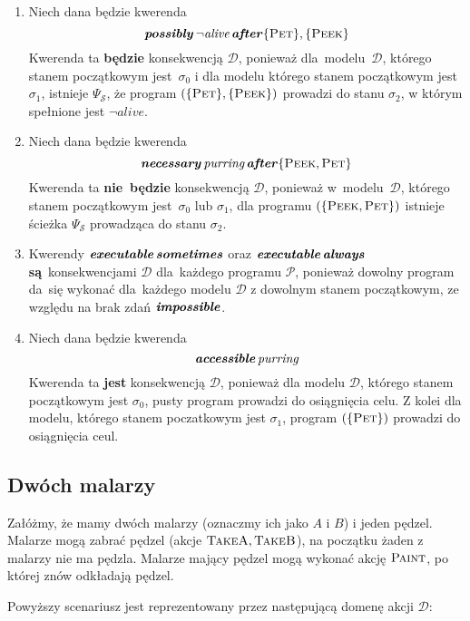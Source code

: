 \documentclass[11pt,a4paper]{article}
\DeclareMathOperator{\After}{\textbf{\textit{after}}}
\DeclareMathOperator{\Impossible}{\textbf{\textit{impossible}}}
\DeclareMathOperator{\Always}{\textbf{\textit{always}}}
\DeclareMathOperator{\Sometimes}{\textbf{\textit{sometimes}}}
\DeclareMathOperator{\Executable}{\textbf{\textit{executable}}}
\DeclareMathOperator{\Accessible}{\textbf{\textit{accessible}}}
\DeclareMathOperator{\Possibly}{\textbf{\textit{possibly}}}
\DeclareMathOperator{\Necessary}{\textbf{\textit{necessary}}}
\begin{document}
\begin{enumerate}
    \item Niech dana będzie kwerenda
    $$ \Possibly \neg \textit{alive} \After \{ \textsc{Pet} \}, \{ \textsc{Peek} \} $$
    Kwerenda ta \textbf{będzie} konsekwencją $\mathcal{D}$, ponieważ dla~modelu~$\mathcal{D}$, którego stanem początkowym jest~$\sigma_0$ i dla modelu którego stanem początkowym jest $\sigma_1$, istnieje $\Psi_\mathcal{S}$, że program $(\{ \textsc{Pet} \}, \{ \textsc{Peek} \})$ prowadzi do stanu $\sigma_2$, w którym spełnione jest $\neg \textit{alive}$.

    \item Niech dana będzie kwerenda
    $$ \Necessary \textit{purring} \After \{ \textsc{Peek}, \textsc{Pet} \} $$
    Kwerenda ta \textbf{nie~będzie} konsekwencją $\mathcal{D}$, ponieważ w~modelu~$\mathcal{D}$, którego stanem początkowym jest~$\sigma_0$ lub $\sigma_1$, dla programu $(\{ \textsc{Peek}, \textsc{Pet} \})$ istnieje ścieżka $\Psi_\mathcal{S}$ prowadząca   do stanu $\sigma_2$.

    \item Kwerendy $\Executable \Sometimes$ oraz $\Executable \Always$ \textbf{są}~konsekwencjami $\mathcal{D}$ dla~każdego programu $\mathcal{P}$, ponieważ dowolny program da~się wykonać dla~każdego modelu $\mathcal{D}$ z dowolnym stanem początkowym, ze względu na brak zdań $\Impossible$.

    \item Niech dana będzie kwerenda
    $$ \Accessible \textit{purring} $$
    Kwerenda ta \textbf{jest} konsekwencją $\mathcal{D}$, ponieważ dla modelu $\mathcal{D}$, którego stanem początkowym jest $\sigma_0$, pusty program prowadzi do osiągnięcia celu. Z kolei dla modelu, którego stanem poczatkowym jest $\sigma_1$, program $(\{\textsc{Pet}\})$ prowadzi do osiągnięcia ceul.
\end{enumerate}

\subsection{Dwóch malarzy}
\label{subsec:two-painters-example}

Załóżmy, że mamy dwóch malarzy (oznaczmy ich jako $A$ i $B$) i jeden pędzel. Malarze mogą zabrać pędzel (akcje $\textsc{TakeA},\textsc{TakeB}$), na początku żaden z malarzy nie ma pędzla. Malarze mający pędzel mogą wykonać akcję $\textsc{Paint}$, po której znów odkładają pędzel.

Powyższy scenariusz jest reprezentowany przez następującą domenę akcji $\mathcal{D}$:
\end{document}
